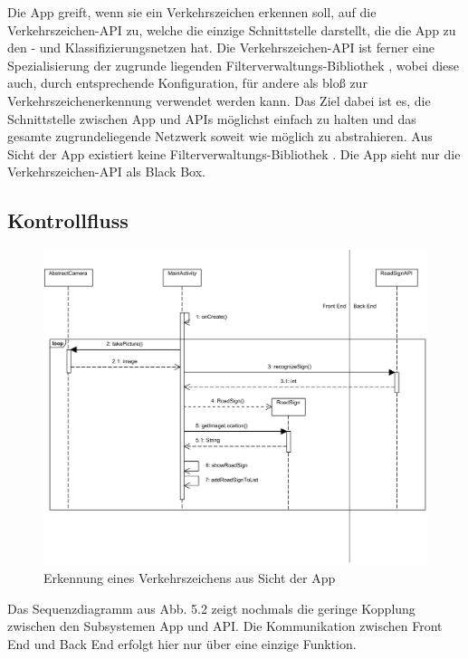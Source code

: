 \documentclass[12pt,a4paper,ngerman,enabledeprecatedfontcommands]{scrreprt}
\begin{document}
Die \gls{App} greift, wenn sie ein Verkehrszeichen erkennen soll, auf die \gls{Verkehrszeichen-API} zu, welche die einzige Schnittstelle darstellt, die die \gls{App} zu den - und Klassifizierungsnetzen hat. Die \gls{Verkehrszeichen-API} ist ferner eine Spezialisierung der zugrunde liegenden  \gls{Filterverwaltungs-Bibliothek} , wobei diese auch, durch entsprechende Konfiguration, für andere  als bloß zur Verkehrszeichenerkennung verwendet werden kann. Das Ziel dabei ist es, die Schnittstelle zwischen \gls{App} und \gls{API}s möglichst einfach zu halten und das gesamte zugrundeliegende Netzwerk soweit wie möglich zu abstrahieren. Aus Sicht der \gls{App} existiert keine  \gls{Filterverwaltungs-Bibliothek} . Die \gls{App} \glqq{}sieht\grqq{} nur die \gls{Verkehrszeichen-API} als Black Box.\\

\subsection{Kontrollfluss}
\begin{figure}[H]
\centering
\includegraphics[width=0.9\linewidth]{Reviewdokument/Grafiken/Sequence_Diagram.png}
\caption{Erkennung eines Verkehrszeichens aus Sicht der App}
\end{figure}

Das Sequenzdiagramm aus Abb. 5.2 zeigt nochmals die geringe Kopplung zwischen den Subsystemen \gls{App} und \gls{API}. Die Kommunikation zwischen Front End und Back End erfolgt hier nur über eine einzige Funktion.\\
\label{subsec:kontrollfluss}
\end{document}
